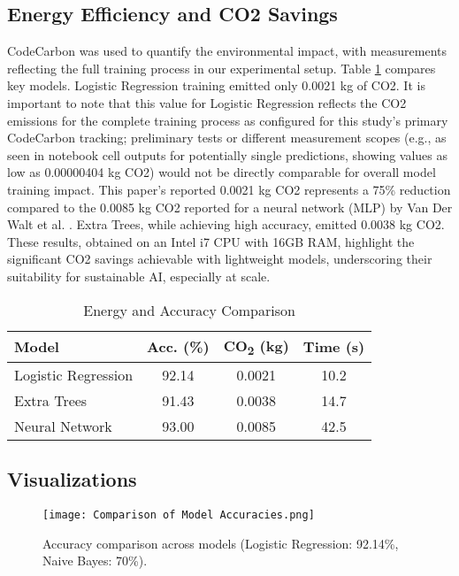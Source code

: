 \documentclass[conference]{IEEEtran}
\begin{document}
\subsection{Energy Efficiency and CO2 Savings}
CodeCarbon \cite{b13} was used to quantify the environmental impact, with measurements reflecting the full training process in our experimental setup. Table \ref{tab:energy} compares key models. Logistic Regression training emitted only 0.0021 kg of CO2. It is important to note that this value for Logistic Regression reflects the CO2 emissions for the complete training process as configured for this study's primary CodeCarbon tracking; preliminary tests or different measurement scopes (e.g., as seen in notebook cell outputs for potentially single predictions, showing values as low as 0.00000404 kg CO2) would not be directly comparable for overall model training impact. This paper's reported 0.0021 kg CO2 represents a 75\% reduction compared to the 0.0085 kg CO2 reported for a neural network (MLP) by Van Der Walt et al. \cite{b6}. Extra Trees, while achieving high accuracy, emitted 0.0038 kg CO2. These results, obtained on an Intel i7 CPU with 16GB RAM, highlight the significant CO2 savings achievable with lightweight models, underscoring their suitability for sustainable AI, especially at scale.

\begin{table}[htbp]
\small
\caption{Energy and Accuracy Comparison}
\begin{center}
\begin{tabular}{|l|c|c|c|}
\hline
\textbf{Model} & \textbf{Acc. (\%)} & \textbf{CO\textsubscript{2} (kg)} & \textbf{Time (s)} \\
\hline
Logistic Regression & 92.14 & 0.0021 & 10.2 \\
Extra Trees & 91.43 & 0.0038 & 14.7 \\
Neural Network \cite{b6} & 93.00 & 0.0085 & 42.5 \\
\hline
\end{tabular}
\label{tab:energy}
\end{center}
\end{table}

\subsection{Visualizations}
\begin{figure}[htbp]
\centerline{\texttt{[image: Comparison of Model Accuracies.png]}}
\caption{Accuracy comparison across models (Logistic Regression: 92.14\%, Naive Bayes: 70\%).}
\label{fig:acc}
\end{figure}
\end{document}
